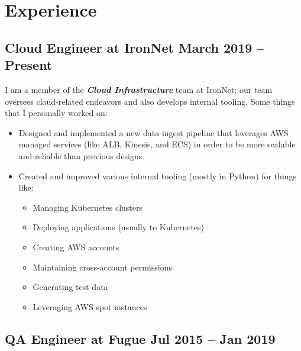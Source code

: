 \documentclass[12pt]{article}
\begin{document}

\section*{Experience}

\subsection*{Cloud Engineer at IronNet \hfill March 2019 -- Present}

I am a member of the \textbf{\textsl{Cloud Infrastructure}} team at IronNet; our
team oversees cloud-related endeavors and also develops internal tooling. Some
things that I personally worked on:

\begin{itemize}
\item Designed and implemented a new data-ingest pipeline that leverages AWS
  managed services (like ALB, Kinesis, and ECS) in order to be more scalable and
  reliable than previous designs.
\item Created and improved various internal tooling (mostly in Python) for
  things like:

  \begin{multicols}{2}
    \raggedright
    \begin{itemize}
    \item Managing Kubernetes clusters
    \item Deploying applications (usually to Kubernetes)
    \item Creating AWS accounts
    \item Maintaining cross-account permissions
    \item Generating test data
    \item Leveraging AWS spot instances
    \end{itemize}
  \end{multicols}

\end{itemize}

     
 

\subsection*{QA Engineer at Fugue \hfill Jul 2015 -- Jan 2019}
\end{document}

